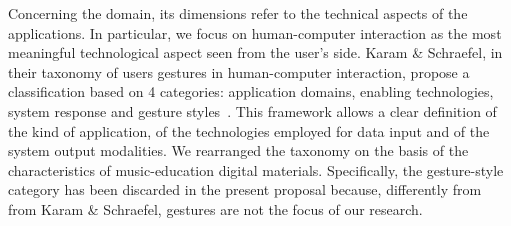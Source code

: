 \documentclass[10pt,journal,compsoc]{IEEEtran}
\newcommand{\domain}[1]{{\fontfamily{cmss}\selectfont {\textsc{#1}}}}
\begin{document}
Concerning the \domain{Technological} domain, its dimensions refer to the technical aspects of the applications. In particular, we focus on human-computer interaction as the most meaningful technological aspect seen from the user's side. Karam \& Schraefel, in their taxonomy of users gestures in human-computer interaction, propose a classification based on 4 categories: application domains, enabling technologies, system response and gesture styles~\cite{karam2005taxonomy}. This framework allows a clear definition of the kind of application, of the technologies employed for data input and of the system output modalities. We rearranged the taxonomy on the basis of the characteristics of music-education digital materials. Specifically, the gesture-style category has been discarded in the present proposal because, differently from from Karam \& Schraefel, gestures are not the focus of our research. 
\end{document}

